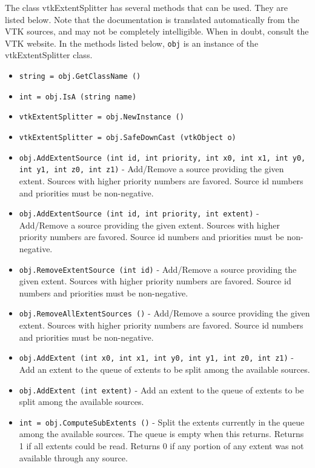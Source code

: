 The class vtkExtentSplitter has several methods that can be used.
  They are listed below.
Note that the documentation is translated automatically from the VTK sources,
and may not be completely intelligible.  When in doubt, consult the VTK website.
In the methods listed below, \verb|obj| is an instance of the vtkExtentSplitter class.
\begin{itemize}
\item  \verb|string = obj.GetClassName ()|

\item  \verb|int = obj.IsA (string name)|

\item  \verb|vtkExtentSplitter = obj.NewInstance ()|

\item  \verb|vtkExtentSplitter = obj.SafeDownCast (vtkObject o)|

\item  \verb|obj.AddExtentSource (int id, int priority, int x0, int x1, int y0, int y1, int z0, int z1)| -  Add/Remove a source providing the given extent.  Sources with
 higher priority numbers are favored.  Source id numbers and
 priorities must be non-negative.

\item  \verb|obj.AddExtentSource (int id, int priority, int extent)| -  Add/Remove a source providing the given extent.  Sources with
 higher priority numbers are favored.  Source id numbers and
 priorities must be non-negative.

\item  \verb|obj.RemoveExtentSource (int id)| -  Add/Remove a source providing the given extent.  Sources with
 higher priority numbers are favored.  Source id numbers and
 priorities must be non-negative.

\item  \verb|obj.RemoveAllExtentSources ()| -  Add/Remove a source providing the given extent.  Sources with
 higher priority numbers are favored.  Source id numbers and
 priorities must be non-negative.

\item  \verb|obj.AddExtent (int x0, int x1, int y0, int y1, int z0, int z1)| -  Add an extent to the queue of extents to be split among the
 available sources.

\item  \verb|obj.AddExtent (int extent)| -  Add an extent to the queue of extents to be split among the
 available sources.

\item  \verb|int = obj.ComputeSubExtents ()| -  Split the extents currently in the queue among the available
 sources.  The queue is empty when this returns.  Returns 1 if all
 extents could be read.  Returns 0 if any portion of any extent
 was not available through any source.


\end{itemize}
